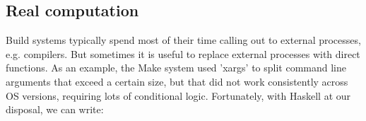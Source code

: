 

%
%
%
%

\subsection{Real computation\label{sec:real_code}}

Build systems typically spend most of their time calling out to external
processes, e.g. compilers. But sometimes it is useful to replace external processes
with direct functions. As an example, the Make system used \lst'xargs' to
split command line arguments that exceed a certain size, but that did not work
consistently across OS versions, requiring lots of conditional logic.
Fortunately, with Haskell at our disposal, we can write:

